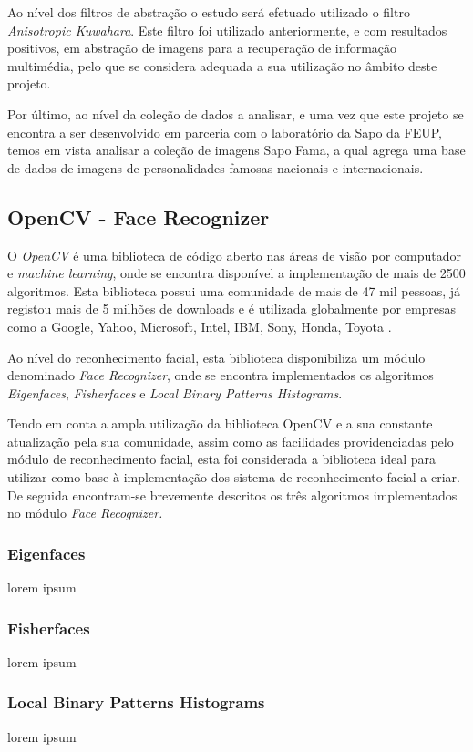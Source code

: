 Ao nível dos filtros de abstração o estudo será efetuado utilizado o filtro \textit{Anisotropic Kuwahara}.
Este filtro foi utilizado anteriormente, e com resultados positivos, em abstração de imagens para a recuperação de informação multimédia, pelo que se considera adequada a sua utilização no âmbito deste projeto.

Por último, ao nível da coleção de dados a analisar, e uma vez que este projeto se encontra a ser desenvolvido em parceria com o laboratório da Sapo da FEUP, temos em vista analisar a coleção de imagens Sapo Fama, a qual agrega uma base de dados de imagens de personalidades famosas nacionais e internacionais.
	
\subsection{OpenCV - Face Recognizer}
O \textit{OpenCV} é uma biblioteca de código aberto nas áreas de visão por computador e \textit{machine learning}, onde se encontra disponível a implementação de mais de 2500 algoritmos. Esta biblioteca possui uma comunidade de mais de 47 mil pessoas, já registou mais de 5 milhões de downloads e é utilizada globalmente por empresas como a Google, Yahoo, Microsoft, Intel, IBM, Sony, Honda, Toyota \cite{Team}. 

Ao nível do reconhecimento facial, esta biblioteca disponibiliza um módulo denominado \textit{Face Recognizer}, onde se encontra implementados os algoritmos \textit{Eigenfaces}, \textit{Fisherfaces} e \textit{Local Binary Patterns Histograms}.

Tendo em conta a ampla utilização da biblioteca OpenCV e a sua constante atualização pela sua comunidade, assim como as facilidades providenciadas pelo módulo de reconhecimento facial, esta foi considerada a biblioteca ideal para utilizar como base à implementação dos sistema de reconhecimento facial a criar. De seguida encontram-se brevemente descritos os três algoritmos implementados no módulo \textit{Face Recognizer.}

\subsubsection{Eigenfaces}
lorem ipsum

\subsubsection{Fisherfaces}
lorem ipsum

\subsubsection{Local Binary Patterns Histograms}
lorem ipsum

